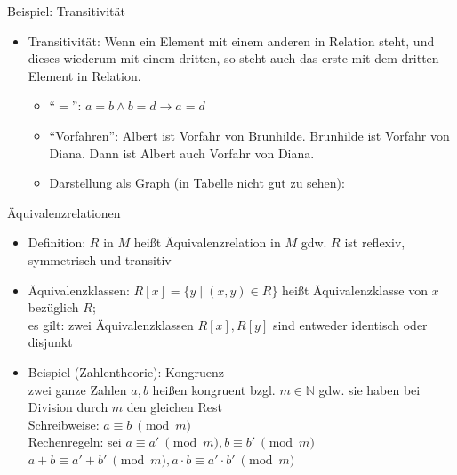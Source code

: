 \begin{frame}{Beispiel: Transitivität}
	\begin{itemize}
		\item Transitivität: Wenn ein Element mit einem anderen in Relation steht, und dieses wiederum mit einem dritten, so steht auch das erste mit dem dritten Element in Relation.
		\begin{itemize}
			\item "`$=$"': $a=b \land b=d \rightarrow a=d$
			\item "`Vorfahren"': Albert ist Vorfahr von Brunhilde. Brunhilde ist Vorfahr von Diana. Dann ist Albert auch Vorfahr von Diana.
			\item Darstellung als Graph (in Tabelle nicht gut zu sehen):\\
			\vspace{1em}
		\end{itemize}
	\end{itemize}	
\end{frame}

\begin{frame}{Äquivalenzrelationen}
	\begin{itemize}
		\item Definition: $R$ in $M$ heißt Äquivalenzrelation in $M$ gdw. $R$ ist reflexiv, symmetrisch und transitiv
		\item Äquivalenzklassen: $R[x]=\{y \mid (x,y) \in R\}$ heißt Äquivalenzklasse von $x$ bezüglich $R$;\\
			es gilt: zwei Äquivalenzklassen $R[x], R[y]$ sind entweder identisch oder disjunkt
		\item Beispiel (Zahlentheorie): Kongruenz\\
			zwei ganze Zahlen $a,b$ heißen kongruent bzgl. $m \in \mathbb{N}$ gdw. sie haben bei Division durch $m$ den gleichen Rest\\
			Schreibweise: $a \equiv b\ \pmod{m}$\\
			Rechenregeln: sei $a \equiv a'\ \pmod{m}, b \equiv b'\ \pmod{m}$\\
			$a+b\equiv a'+b'\ \pmod{m}, a \cdot b \equiv a' \cdot b'\ \pmod{m}$
	\end{itemize}
\end{frame}

